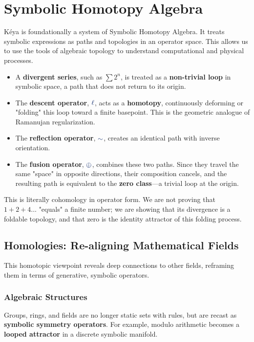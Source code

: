 \section{Symbolic Homotopy Algebra}

Kéya is foundationally a system of Symbolic Homotopy Algebra. It treats symbolic expressions as paths and topologies in an operator space. This allows us to use the tools of algebraic topology to understand computational and physical processes.

\begin{itemize}
    \item A \textbf{divergent series}, such as $\sum 2^n$, is treated as a \textbf{non-trivial loop} in symbolic space, a path that does not return to its origin.
    \item The \textbf{descent operator}, $\lha$, acts as a \textbf{homotopy}, continuously deforming or "folding" this loop toward a finite basepoint. This is the geometric analogue of Ramanujan regularization.
    \item The \textbf{reflection operator}, $\reflec$, creates an identical path with inverse orientation.
    \item The \textbf{fusion operator}, $\fuse$, combines these two paths. Since they travel the same "space" in opposite directions, their composition cancels, and the resulting path is equivalent to the \textbf{zero class}—a trivial loop at the origin.
\end{itemize}

This is literally cohomology in operator form. We are not proving that $1+2+4...$ "equals" a finite number; we are showing that its divergence is a foldable topology, and that zero is the identity attractor of this folding process.

\subsection{Homologies: Re-aligning Mathematical Fields}
This homotopic viewpoint reveals deep connections to other fields, reframing them in terms of generative, symbolic operators.

\subsubsection{Algebraic Structures}
Groups, rings, and fields are no longer static sets with rules, but are recast as \textbf{symbolic symmetry operators}. For example, modulo arithmetic becomes a \textbf{looped attractor} in a discrete symbolic manifold.

